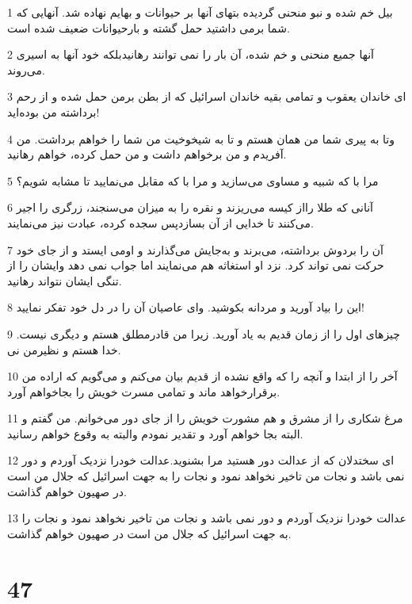 \par 1 بیل خم شده و نبو منحنی گردیده بتهای آنها بر حیوانات و بهایم نهاده شد. آنهایی که شما برمی داشتید حمل گشته و بارحیوانات ضعیف شده است.
\par 2 آنها جمیع منحنی و خم شده، آن بار را نمی توانند رهانیدبلکه خود آنها به اسیری می‌روند.
\par 3 ‌ای خاندان یعقوب و تمامی بقیه خاندان اسرائیل که از بطن برمن حمل شده و از رحم برداشته من بوده‌اید!
\par 4 وتا به پیری شما من همان هستم و تا به شیخوخیت من شما را خواهم برداشت. من آفریدم و من برخواهم داشت و من حمل کرده، خواهم رهانید.
\par 5 مرا با که شبیه و مساوی می‌سازید و مرا با که مقابل می‌نمایید تا مشابه شویم؟
\par 6 آنانی که طلا رااز کیسه می‌ریزند و نقره را به میزان می‌سنجند، زرگری را اجیر می‌کنند تا خدایی از آن بسازدپس سجده کرده، عبادت نیز می‌نمایند.
\par 7 آن را بردوش برداشته، می‌برند و به‌جایش می‌گذارند و اومی ایستد و از جای خود حرکت نمی تواند کرد. نزد او استغاثه هم می‌نمایند اما جواب نمی دهد وایشان را از تنگی ایشان نتواند رهانید.
\par 8 این را بیاد آورید و مردانه بکوشید. و‌ای عاصیان آن را در دل خود تفکر نمایید!
\par 9 چیزهای اول را از زمان قدیم به یاد آورید. زیرا من قادرمطلق هستم و دیگری نیست. خدا هستم و نظیرمن نی.
\par 10 آخر را از ابتدا و آنچه را که واقع نشده از قدیم بیان می‌کنم و می‌گویم که اراده من برقرارخواهد ماند و تمامی مسرت خویش را بجاخواهم آورد.
\par 11 مرغ شکاری را از مشرق و هم مشورت خویش را از جای دور می‌خوانم. من گفتم و البته بجا خواهم آورد و تقدیر نمودم والبته به وقوع خواهم رسانید.
\par 12 ‌ای سختدلان که از عدالت دور هستید مرا بشنوید.عدالت خودرا نزدیک آوردم و دور نمی باشد و نجات من تاخیر نخواهد نمود و نجات را به جهت اسرائیل که جلال من است در صهیون خواهم گذاشت.
\par 13 عدالت خودرا نزدیک آوردم و دور نمی باشد و نجات من تاخیر نخواهد نمود و نجات را به جهت اسرائیل که جلال من است در صهیون خواهم گذاشت.
 
\chapter{47}

